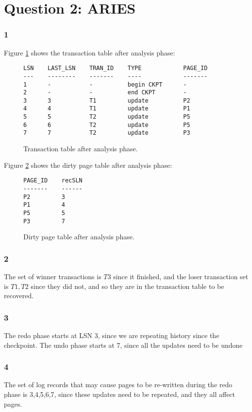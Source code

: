 \section{Question 2: ARIES}

\subsubsection{1}

Figure \ref{transactiontable} shows the transaction table after analysis phase:
\begin{figure}[h!]
\begin{verbatim}
LSN    LAST_LSN    TRAN_ID    TYPE            PAGE_ID
---    --------    -------    ----            -------
1      -           -          begin CKPT      -
2      -           -          end CKPT        -
3      3           T1         update          P2
4      4           T1         update          P1
5      5           T2         update          P5
6      6           T2         update          P5
7      7           T2         update          P3
\end{verbatim}
\caption{Transaction table after analysis phase.\label{transactiontable}}
\end{figure}

Figure \ref{dirtypagetable} shows the dirty page table after analysis phase:
\begin{figure}[h!]
\begin{verbatim}
PAGE_ID    recSLN
-------    ------
P2         3
P1         4
P5         5
P3         7
\end{verbatim}
\caption{Dirty page table after analysis phase.\label{dirtypagetable}}
\end{figure}

\subsubsection{2}
The set of winner transactions is ${T3}$ since it finished, and the loser transaction set is ${T1,T2}$ since they did not, and so they are in the transaction table to be recovered.

\subsubsection{3}
The redo phase starts at LSN 3, since we are repeating history since the checkpoint. The undo phase starts at 7, since all the updates need to be undone

\subsubsection{4}
The set of log records that may cause pages to be re-written during the redo phase is {3,4,5,6,7}, since these updates need to be repeated, and they all affect pages.

